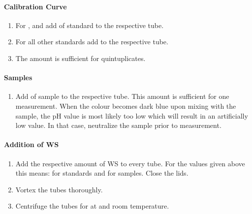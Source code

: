 \paragraph{Calibration Curve}
\begin{enumerate}
	\setcounter{enumi}{\value{sirofluor-protocol}}
	\item For ,  and  add  of standard to the respective tube.
	\item For all other standards add  to the respective tube.
	\item The amount is sufficient for quintuplicates.
	\setcounter{sirofluor-protocol}{\value{enumi}}
\end{enumerate}

\paragraph{Samples}
\begin{enumerate}
	\setcounter{enumi}{\value{sirofluor-protocol}}
	\item Add  of sample to the respective tube. This amount is sufficient for one measurement.\newline
		When the colour becomes dark blue upon mixing with the sample, the pH value is most likely too low which will result in an artificially low value. In that case, neutralize the sample prior to measurement.
	\setcounter{sirofluor-protocol}{\value{enumi}}
\end{enumerate}

\paragraph{Addition of WS}
\begin{enumerate}
	\setcounter{enumi}{\value{sirofluor-protocol}}
	\item Add the respective amount of WS to every tube. For the values given above this means:  for standards and  for samples. Close the lids.
	\item Vortex the tubes thoroughly.
	\item Centrifuge the tubes for  at  and room temperature.
	\setcounter{sirofluor-protocol}{\value{enumi}}
\end{enumerate}

